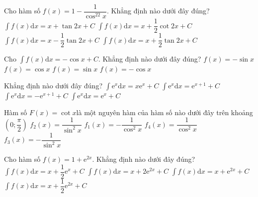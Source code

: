 \begin{ex}
	[Mã 101 - 2022]%
	Cho hàm số $ f(x)=1-\dfrac{1}{\cos^22x}$. Khẳng định nào dưới đây đúng?
	\choice
	{$\displaystyle\int{f(x)}\mathrm{d}x=x+\tan 2x+C$}
	{$\displaystyle\int{f(x)}\mathrm{d}x=x+\dfrac{1}{2}\cot 2x+C$}
	{\True $\displaystyle\int{f(x)}\mathrm{d}x=x-\dfrac{1}{2}\tan 2x+C$}
	{$\displaystyle\int{f(x)}\mathrm{d}x=x+\dfrac{1}{2}\tan 2x+C$}
\end{ex}
\begin{ex}
	[Mã 102 - 2022]%
	Cho $\displaystyle\int{f(x)}\mathrm{d}x=-\cos x+C$. Khẳng định nào dưới đây đúng?
	\choice
	{$ f(x)=-\sin x$}
	{$ f(x)=\cos x$}
	{\True $ f(x)=\sin x$}
	{$ f(x)=-\cos x$}
\end{ex}
\begin{ex}
	[Mã 103 - 2022]%
	Khẳng định nào dưới đây đúng?
	\choice
	{$\displaystyle\int{\mathrm{e}^x\mathrm{d}x=x{\mathrm{e}^x}+C}$}
	{$\displaystyle\int{\mathrm{e}^x\mathrm{d}x=\mathrm{e}^{x+1}+C}$}
	{$\displaystyle\int{\mathrm{e}^x\mathrm{d}x=-\mathrm{e}^{x+1}+C}$}
	{\True $\displaystyle\int{\mathrm{e}^x\mathrm{d}x=\mathrm{e}^x+C}$}
\end{ex}
\begin{ex}
	[Mã 103 - 2022]%
	Hàm số $ F(x)=\cot x$là một nguyên hàm của hàm số nào dưới đây trên khoảng $\left(0;\dfrac{\pi}{2}\right)$
	\choice
	{$f_2(x)=\dfrac{1}{\sin^2x}$}
	{$f_1(x)=-\dfrac{1}{\cos^2x}$}
	{$f_4(x)=\dfrac{1}{\cos^2x}$}
	{\True $f_3(x)=-\dfrac{1}{\sin^2x}$}
\end{ex}
\begin{ex}
	[Mã 104 - 2022]%
	Cho hàm số $ f(x)=1+\mathrm{e}^{2x}$. Khẳng định nào dưới đây đúng?
	\choice
	{$\displaystyle\int{f(x)\mathrm{d}x=x+\dfrac{1}{2}{\mathrm{e}^x}+C}$}
	{$\displaystyle\int{f(x)\mathrm{d}x=x+2\mathrm{e}^{2x}+C}$}
	{$\displaystyle\int{f(x)\mathrm{d}x=x+\mathrm{e}^{2x}+C}$}
	{\True $\displaystyle\int{f(x)\mathrm{d}x=x+\dfrac{1}{2}{\mathrm{e}^{2x}}+C}$}
\end{ex}         
